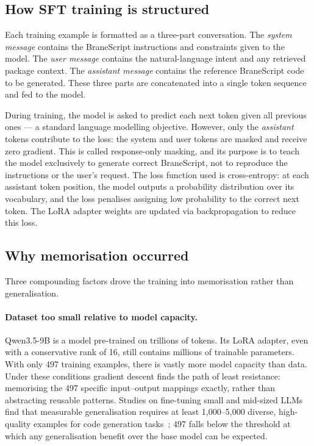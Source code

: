 \subsection{How SFT training is structured}

Each training example is formatted as a three-part conversation. The
\emph{system message} contains the BraneScript instructions and constraints
given to the model. The \emph{user message} contains the natural-language
intent and any retrieved package context. The \emph{assistant message}
contains the reference BraneScript code to be generated. These three parts
are concatenated into a single token sequence and fed to the model.

During training, the model is asked to predict each next token given all
previous ones --- a standard language modelling objective. However, only
the \emph{assistant} tokens contribute to the loss: the system and user
tokens are masked and receive zero gradient. This is called response-only
masking, and its purpose is to teach the model exclusively to generate
correct BraneScript, not to reproduce the instructions or the user's request.
The loss function used is cross-entropy: at each assistant token position,
the model outputs a probability distribution over its vocabulary, and the
loss penalises assigning low probability to the correct next token. The
LoRA adapter weights are updated via backpropagation to reduce this loss.

\subsection{Why memorisation occurred}

Three compounding factors drove the training into memorisation rather than
generalisation.

\paragraph{Dataset too small relative to model capacity.}
Qwen3.5-9B is a model pre-trained on trillions of tokens. Its LoRA adapter,
even with a conservative rank of 16, still contains millions of trainable
parameters. With only 497 training examples, there is vastly more model
capacity than data. Under these conditions gradient descent finds the path
of least resistance: memorising the 497 specific input--output mappings
exactly, rather than abstracting reusable patterns. Studies on fine-tuning
small and mid-sized LLMs find that measurable generalisation requires at least
1{,}000--5{,}000 diverse, high-quality examples for code generation
tasks~\cite{guo2025unveiling,chen2025massive}; 497 falls below the threshold
at which any generalisation benefit over the base model can be expected.

